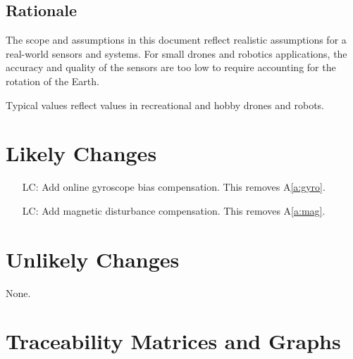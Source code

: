 \documentclass[12pt]{article}
\newcommand{\aref}[1]{A\ref{#1}} \newcounter{goalnum} %
\begin{document}
\subsection{Rationale}

The scope and assumptions in this document reflect realistic assumptions for a real-world sensors
and systems. For small drones and robotics applications, the accuracy and quality of the sensors are
too low to require accounting for the rotation of the Earth.

Typical values reflect values in recreational and hobby drones and robots.


\section{Likely Changes} \label{sec:likely_changes}

\begin{itemize}
    \item[LC\refstepcounter{lcnum}\thelcnum\label{lc:gyro}:] Add online gyroscope bias compensation.
    This removes \aref{a:gyro}.
    \item[LC\refstepcounter{lcnum}\thelcnum\label{lc:mag}:] Add magnetic disturbance compensation.
    This removes \aref{a:mag}.
\end{itemize}

\section{Unlikely Changes} \label{sec:unlikely_changes}

None.


\section{Traceability Matrices and Graphs} \label{sec:trace}
\end{document}
